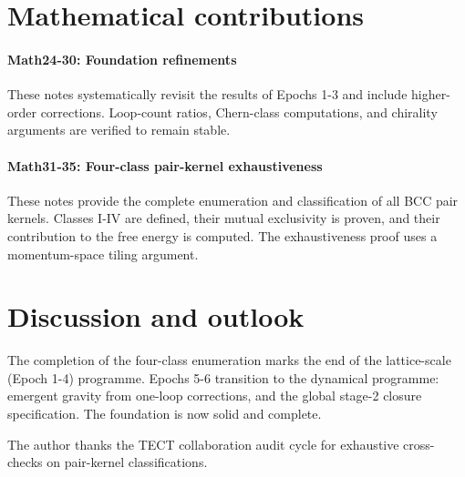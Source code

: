 \section{Mathematical contributions}

\paragraph{Math24-30: Foundation refinements}
These notes systematically revisit the results of Epochs 1-3 and include higher-order
corrections. Loop-count ratios, Chern-class computations, and chirality arguments are
verified to remain stable. \cite{Math24, Math25, Math26, Math27, Math28, Math29, Math30}

\paragraph{Math31-35: Four-class pair-kernel exhaustiveness}
These notes provide the complete enumeration and classification of all BCC pair kernels.
Classes I-IV are defined, their mutual exclusivity is proven, and their contribution to the
free energy is computed. The exhaustiveness proof uses a momentum-space tiling argument.
\cite{Math31, Math32, Math33, Math34, Math35}

\section{Discussion and outlook}
The completion of the four-class enumeration marks the end of the lattice-scale (Epoch 1-4)
programme. Epochs 5-6 transition to the dynamical programme: emergent gravity from
one-loop corrections, and the global stage-2 closure specification. The foundation is now
solid and complete.

\begin{acknowledgments}
The author thanks the TECT collaboration audit cycle for exhaustive cross-checks on pair-kernel classifications.
\end{acknowledgments}






